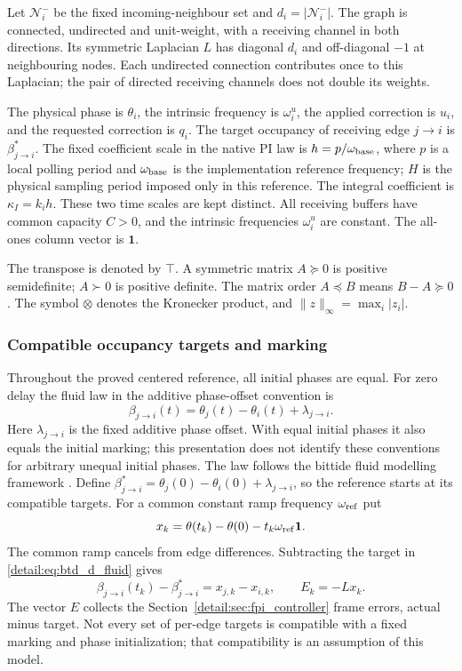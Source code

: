 Let $\mathcal N_i^-$ be the fixed incoming-neighbour set and
$d_i=|\mathcal N_i^-|$. The graph is connected, undirected and unit-weight,
with a receiving channel in both directions. Its symmetric Laplacian
$L$ has diagonal $d_i$ and off-diagonal $-1$ at neighbouring nodes. Each
undirected connection contributes once to this Laplacian; the pair of
directed receiving channels does not double its weights.

The physical phase is $\theta_i$, the intrinsic frequency is
$\omega_i^u$, the applied correction is $u_i$, and the requested correction
is $q_i$. The target occupancy of receiving edge $j\to i$ is
$\beta^*_{j\to i}$. The fixed coefficient scale in the native PI law is
$h=p/\omega_{\rm base}$, where $p$ is a local polling period and
$\omega_{\rm base}$ is the implementation reference frequency; $H$ is the
physical sampling period imposed only in this reference. The integral
coefficient is $\kappa_I=k_i h$. These two time scales are kept distinct.
All receiving buffers have common capacity $C>0$, and the intrinsic
frequencies $\omega_i^u$ are constant. The all-ones column vector is $\mathbf1$.

The transpose is denoted by $\top$. A symmetric matrix $A\succeq0$ is
positive semidefinite; $A\succ0$ is positive definite. The matrix order
$A\preceq B$ means $B-A\succeq0$. The symbol $\otimes$ denotes the
Kronecker product, and $\|z\|_\infty=\max_i|z_i|$.

\subsubsection{Compatible occupancy targets and marking}
Throughout the proved centered reference, all initial phases are equal.
For zero delay the fluid law in the additive phase-offset convention is
\begin{equation}
 \beta_{j\to i}(t)=\theta_j(t)-\theta_i(t)+\lambda_{j\to i}.
 \label{detail:eq:btd_d_fluid}
\end{equation}
Here $\lambda_{j\to i}$ is the fixed additive phase offset. With equal
initial phases it also equals the initial marking; this presentation does
not identify these conventions for arbitrary unequal initial phases.
The law follows the bittide fluid modelling framework
\cite{lall2024logicalSynchrony,lall2022resistance}. Define
$\beta^*_{j\to i}=\theta_j(0)-\theta_i(0)+\lambda_{j\to i}$, so the
reference starts at its compatible targets. For a common constant ramp
frequency $\omega_{\rm ref}$ put
\begin{equation}
 x_k=\theta(t_k)-\theta(0)-t_k\omega_{\rm ref}\mathbf1.
 \label{detail:eq:btd_ref_state}
\end{equation}
The common ramp cancels from edge differences. Subtracting the target in
\eqref{detail:eq:btd_d_fluid} gives
\begin{equation}
 \beta_{j\to i}(t_k)-\beta^*_{j\to i}=x_{j,k}-x_{i,k},\qquad E_k=-Lx_k.
 \label{detail:eq:btd_buffer_phase}
\end{equation}
The vector $E$ collects the Section~\ref{detail:sec:fpi_controller} frame errors, actual minus target.
Not every set of per-edge targets is compatible with a fixed marking and
phase initialization; that compatibility is an assumption of this model.

